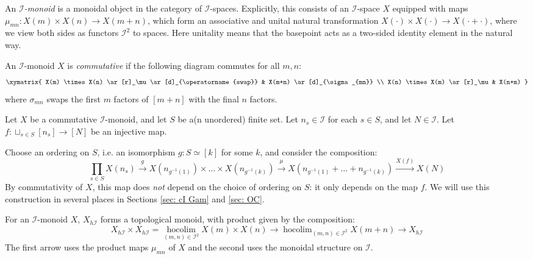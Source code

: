 \documentclass{TPmod}
\newcommand{\cI}{\mathcal{I}}
\renewcommand{\cong}{\simeq}
\numberwithin{equation}{section}
\begin{document}
    \begin{defn}\label{def: Imon}
        An \emph{$\cI$-monoid} is a monoidal object in the category of $\cI$-spaces. Explicitly, this consists of an $\cI$-space $X$ equipped with maps $\mu_{mn}: X(m) \times X(n) \to X(m+n)$, which form an associative and unital natural transformation $X(\cdot) \times X(\cdot) \to X(\cdot+\cdot)$, where we view both sides as functors $\cI^2$ to spaces. Here unitality means that the basepoint acts as a two-sided identity element in the natural way.

        An $\cI$-monoid $X$ is \emph{commutative} if the following diagram commutes for all $m,n$:
        \begin{equation}\label{eq: Imon comm}
            \xymatrix{
                X(m) \times X(n)
                \ar[r]_\mu
                \ar[d]_{\operatorname{swap}}
                &
                X(m+n)
                \ar[d]_{\sigma_{mn}}
                \\
                X(n) \times X(m)
                \ar[r]_\mu
                &
                X(n+m)
            }
        \end{equation}  
        where $\sigma_{mn}$ swaps the first $m$ factors of $[m+n]$ with the final $n$ factors.
    \end{defn}
    \begin{rmk}\label{rmk: inj prob}
        Let $X$ be a commutative $\cI$-monoid, and let $S$ be a(n unordered) finite set. Let $n_s \in \cI$ for each $s \in S$, and let $N \in \cI$. Let $f: \sqcup_{s \in S} [n_s] \to [N]$ be an injective map.

        Choose an ordering on $S$, i.e. an isomorphism $g:S \cong [k]$ for some $k$, and consider the composition:
        \begin{equation}\label{eq: prod}
            \prod_{s \in S} X(n_s) \xrightarrow{g} X(n_{g^{-1}(1)}) \times \ldots \times X(n_{g^{-1}(k)}) \xrightarrow{\mu} X(n_{g^{-1}(1)} + \ldots + n_{g^{-1}(k)}) \xrightarrow{X(f)} X(N)
        \end{equation}
        By commutativity of $X$, this map does \emph{not} depend on the choice of ordering on $S$: it only depends on the map $f$. We will use this construction in several places in Sections \ref{sec: cI Gam} and \ref{sec: OC}.
    \end{rmk}   

    For an $\cI$-monoid $X$, $X_{h\cI}$ forms a topological monoid, with product given by the composition:
    \begin{equation}\label{eq: hI prod}
        X_{h\cI} \times X_{h\cI} = \operatorname{hocolim}\limits_{(m,n) \in \cI^2} X(m) \times X(n) \to \operatorname{hocolim}_{(m,n) \in \cI^2} X(m+n) \to X_{h\cI} 
    \end{equation}
    The first arrow uses the product maps $\mu_{mn}$ of $X$ and the second uses the monoidal structure on $\cI$.
\end{document}
